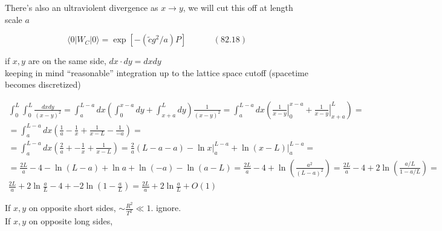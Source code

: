 \documentclass[twoside]{amsart}
\begin{document}
There's also an ultraviolent divergence as $x\to y$, we will cut this off at length scale $a$ 

\begin{equation}
  \langle 0 | W_C | 0 \rangle = \exp{ \left[ - (\widetilde{c} g^2 / a) P \right] } \quad \quad \quad \, (82.18)
\end{equation}

if $x,y$ are on the same side, $dx \cdot dy = dx dy$ \\

keeping in mind ``reasonable'' integration up to the lattice space cutoff (spacetime becomes discretized) 

\[
\begin{gathered}
  \int_0^L \int_0^L \frac{dx dy}{ (x-y)^2 } = \int_a^{L-a} dx \left( \int_0^{x-a} dy + \int_{x+a}^L dy \right) \frac{1}{ (x-y)^2 } = \int_a^{L-a} dx \left( \left. \frac{1}{ x-y} \right|_0^{x-a} + \left. \frac{1}{x-y} \right|_{x+a}^L \right) = \\
  = \int_a^{L-a} dx \left( \frac{1}{a} - \frac{1}{x} + \frac{1}{x-L} - \frac{1}{ -a} \right) = \\
  = \int_a^{L-a} dx \left( \frac{2}{a} + - \frac{1}{x} + \frac{1}{x-L} \right) = \frac{2}{a} (L-a-a ) - \left. \ln{x} \right|_a^{L-a} + \left. \ln{(x-L)} \right|_a^{L-a} = \\
  = \frac{2L}{a} - 4 - \ln{ (L-a) } + \ln{a} + \ln{(-a)} - \ln{(a-L) } = \frac{2L}{a} -4 + \ln{ \left( \frac{a^2}{ (L-a)^2 } \right) } = \frac{2L}{a} - 4 + 2 \ln{ \left( \frac{a/L}{ 1 - a/L} \right) } = \\
  \frac{2L}{a} + 2\ln{ \frac{a}{L} }-  4 + - 2\ln{ \left( 1-  \frac{a}{L} \right) } = \frac{2L}{a} + 2\ln{ \frac{a}{L} } + O(1)
\end{gathered}
\]


If $x,y$ on opposite short sides, $\sim \frac{R^2}{ T^2} \ll 1$.  ignore. \\
If $x,y$ on opposite long sides, 
\end{document}

